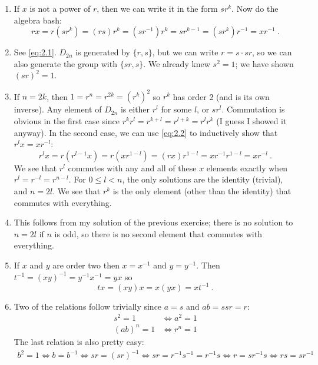 \documentclass[]{article}
\begin{document}
\begin{enumerate}
\begin{enumerate}
\end{enumerate}


\item If $x$ is not a power of $r$, then we can write it in the form $sr^k$. Now do the algebra bash:
\begin{equation}
rx = r(sr^k) = (rs)r^k = (sr^{-1})r^k = sr^{k-1} = (sr^k)r^{-1} = xr^{-1}\ . \label{eq:2.2}
\end{equation}


\item See \eqref{eq:2.1}. $D_{2n}$ is generated by $\{r, s\}$, but we can write $r = s\cdot sr$, so we can also generate the group with $\{sr, s\}$. We already knew $s^2 = 1$; we have shown $(sr)^2 = 1$.


\item If $n = 2k$, then $1 = r^n = r^{2k} = (r^k)^2$ so $r^k$ has order 2 (and is its own inverse). Any element of $D_{2n}$ is either $r^l$ for some $l$, or $sr^l$. Commutation is obvious in the first case since $r^kr^l = r^{k+l} = r^{l+k} = r^lr^k$ (I guess I showed it anyway). In the second case, we can use \eqref{eq:2.2} to inductively show that $r^lx = xr^{-l}$:
\begin{equation}
r^lx = r(r^{l-1}x) = r(xr^{1-l}) = (rx)r^{1-l} = xr^{-1}r^{1-l} = xr^{-l}\ .
\end{equation}
We see that $r^l$ commutes with any and all of these $x$ elements exactly when $r^{l} = r^{-l} = r^{n-l}$. For $0 \leq l < n$, the only solutions are the identity (trivial), and $n = 2l$. We see that $r^k$ is the only element (other than the identity) that commutes with everything.


\item This follows from my solution of the previous exercise; there is no solution to $n = 2l$ if $n$ is odd, so there is no second element that commutes with everything.


\item If $x$ and $y$ are order two then $x = x^{-1}$ and $y = y^{-1}$. Then $t^{-1} = (xy)^{-1} = y^{-1}x^{-1} = yx$ so 
\begin{equation}
tx = (xy)x = x(yx) = xt^{-1} \ .
\end{equation}


\item Two of the relations follow trivially since $a = s$ and $ab = ssr = r$:
\begin{align}
s^2 = 1 &\iff a^2 = 1 \\
(ab)^n = 1 &\iff r^n = 1
\end{align}
The last relation is also pretty easy:
\begin{align}
b^2 = 1 \iff b = b^{-1} \iff sr = (sr)^{-1} \iff sr = r^{-1}s^{-1} = r^{-1}s \iff r = sr^{-1}s \iff rs = sr^{-1}
\end{align}



\end{enumerate}
\end{document}

